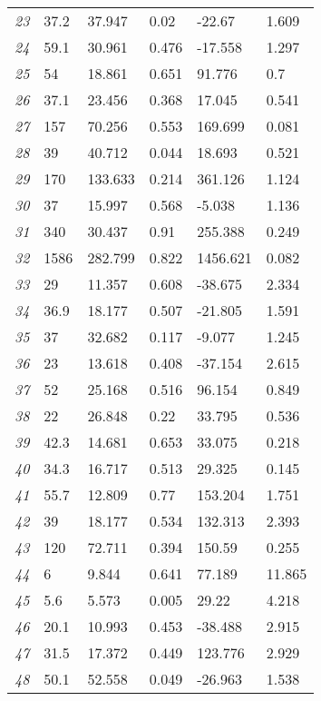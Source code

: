 \documentclass[miyazaki.tex]{subfiles}
\begin{document}
\begin{tabularx}{\textwidth}{| X | X || X | X || X | X |}
	\emph{23} & 37.2 & 37.947 & 0.02 & -22.67 & 1.609 \\
	\emph{24} & 59.1 & 30.961 & 0.476 & -17.558 & 1.297 \\
	\emph{25} & 54 & 18.861 & 0.651 & 91.776 & 0.7 \\
	\emph{26} & 37.1 & 23.456 & 0.368 & 17.045 & 0.541 \\
	\emph{27} & 157 & 70.256 & 0.553 & 169.699 & 0.081 \\
	\emph{28} & 39 & 40.712 & 0.044 & 18.693 & 0.521 \\
	\emph{29} & 170 & 133.633 & 0.214 & 361.126 & 1.124 \\
	\emph{30} & 37 & 15.997 & 0.568 & -5.038 & 1.136 \\
	\emph{31} & 340 & 30.437 & 0.91 & 255.388 & 0.249 \\
	\emph{32} & 1586 & 282.799 & 0.822 & 1456.621 & 0.082 \\
	\emph{33} & 29 & 11.357 & 0.608 & -38.675 & 2.334 \\
	\emph{34} & 36.9 & 18.177 & 0.507 & -21.805 & 1.591 \\
	\emph{35} & 37 & 32.682 & 0.117 & -9.077 & 1.245 \\
	\emph{36} & 23 & 13.618 & 0.408 & -37.154 & 2.615 \\
	\emph{37} & 52 & 25.168 & 0.516 & 96.154 & 0.849 \\
	\emph{38} & 22 & 26.848 & 0.22 & 33.795 & 0.536 \\
	\emph{39} & 42.3 & 14.681 & 0.653 & 33.075 & 0.218 \\
	\emph{40} & 34.3 & 16.717 & 0.513 & 29.325 & 0.145 \\
	\emph{41} & 55.7 & 12.809 & 0.77 & 153.204 & 1.751 \\
	\emph{42} & 39 & 18.177 & 0.534 & 132.313 & 2.393 \\
	\emph{43} & 120 & 72.711 & 0.394 & 150.59 & 0.255 \\
	\emph{44} & 6 & 9.844 & 0.641 & 77.189 & 11.865 \\
	\emph{45} & 5.6 & 5.573 & 0.005 & 29.22 & 4.218 \\
	\emph{46} & 20.1 & 10.993 & 0.453 & -38.488 & 2.915 \\
	\emph{47} & 31.5 & 17.372 & 0.449 & 123.776 & 2.929 \\
	\emph{48} & 50.1 & 52.558 & 0.049 & -26.963 & 1.538 \\
	\hline
	\end{tabularx}
\end{document}
